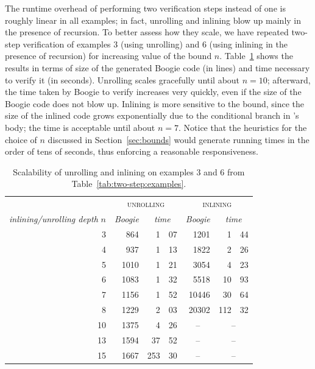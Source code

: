The runtime overhead of performing two verification steps instead of one is roughly linear in all examples; in fact, unrolling and inlining blow up mainly in the presence of recursion.
To better assess how they scale, we have repeated two-step verification of examples 3 (using unrolling) and 6 (using inlining in the presence of recursion) for increasing value of the bound $n$.
Table~\ref{tab:two-step:blowup} shows the results in terms of size of the generated Boogie code (in lines) and time necessary to verify it (in seconds).
Unrolling scales gracefully until about $n=10$; afterward, the time taken by Boogie to verify increases very quickly, even if the size of the Boogie code does not blow up.
Inlining is more sensitive to the bound, since the size of the inlined code grows exponentially due to the conditional branch in 's body; the time is acceptable until about $n = 7$.
Notice that the heuristics for the choice of $n$ discussed in Section~\ref{sec:bounds} would generate running times in the order of tens of seconds, thus enforcing a reasonable responsiveness.



\begin{table}[th]
\centering 
\begin{tabular}{r| r r@{.}l | r r@{.}l }
	&
	\multicolumn{3}{c|}{\textsc{unrolling}}
	&
	\multicolumn{3}{c}{\textsc{inlining}}
	\\
	\textit{inlining/unrolling depth} $n$ &
	\textit{Boogie} 
	&
	\multicolumn{2}{c|}{\textit{time}}
	&
	\textit{Boogie} 
	&
	\multicolumn{2}{c}{\textit{time}}
	\\
  \hline
 3 & 864 & 1&07 & 1201 & 1&44 \\
 4 & 937 & 1&13 & 1822 & 2&26 \\
 5 & 1010 & 1&21 & 3054 & 4&23 \\
 6 & 1083 & 1&32 & 5518 & 10&93 \\
 7 & 1156 & 1&52 & 10446 & 30&64 \\
 8 & 1229 & 2&03 & 20302 & 112&32 \\
 10 & 1375 & 4&26 & \multicolumn{1}{c}{--} & \multicolumn{2}{c}{--} \\
 13 & 1594 & 37&52 & \multicolumn{1}{c}{--} & \multicolumn{2}{c}{--} \\
 15 & 1667 & 253&30 & \multicolumn{1}{c}{--} & \multicolumn{2}{c}{--}
\end{tabular}
\caption{Scalability of unrolling and inlining on examples 3 and 6 from Table~\ref{tab:two-step:examples}.}
\label{tab:two-step:blowup}
\end{table}






